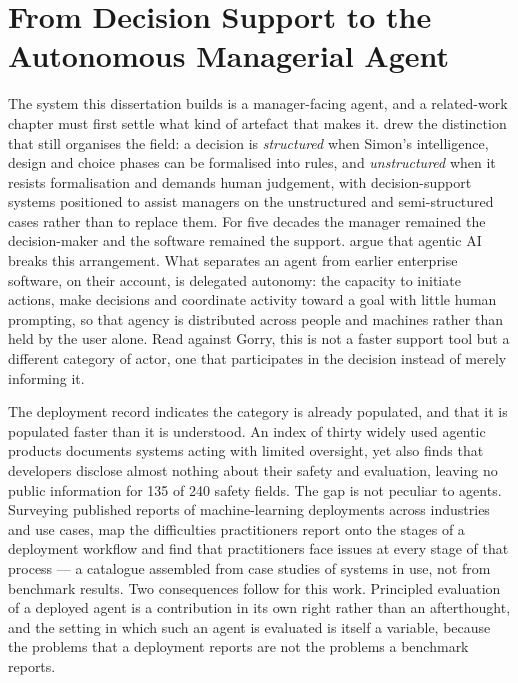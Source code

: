 \section{From Decision Support to the Autonomous Managerial Agent}
\label{sec:rw-framing}

The system this dissertation builds is a manager-facing agent, and a
related-work chapter must first settle what kind of artefact that makes it.
\citet{gorry_framework_1971} drew the distinction that
still organises the field: a decision is \emph{structured} when Simon's
intelligence, design and choice phases can be formalised into rules, and
\emph{unstructured} when it resists formalisation and demands human judgement,
with decision-support systems positioned to assist managers on the
unstructured and semi-structured cases rather than to replace them. For five
decades the manager remained the decision-maker and the software remained the
support. \citet{kumar_agentic_2026} argue that agentic AI breaks
this arrangement. What separates an agent from earlier enterprise software,
on their account, is delegated autonomy: the capacity to initiate actions,
make decisions and coordinate activity toward a goal with little human
prompting, so that agency is distributed across people and machines rather
than held by the user alone. Read against Gorry, this is not a faster support
tool but a different category of actor, one that participates in the decision
instead of merely informing it.

The deployment record indicates the category is already populated, and that it
is populated faster than it is understood. An index of thirty widely used
agentic products \citep{staufer_2025_2026} documents systems acting with limited
oversight, yet also finds that developers disclose almost nothing about their
safety and evaluation, leaving no public information for 135 of 240 safety
fields. The gap is not peculiar to agents. Surveying published reports of
machine-learning deployments across industries and use cases,
\citet{paleyes_challenges_2022} map the difficulties practitioners report onto
the stages of a deployment workflow and find that practitioners face issues at
every stage of that process --- a catalogue assembled from case studies of
systems in use, not from benchmark results. Two consequences follow for this
work. Principled evaluation of a deployed agent is a contribution in its own
right rather than an afterthought, and the setting in which such an agent is
evaluated is itself a variable, because the problems that a deployment reports
are not the problems a benchmark reports.

